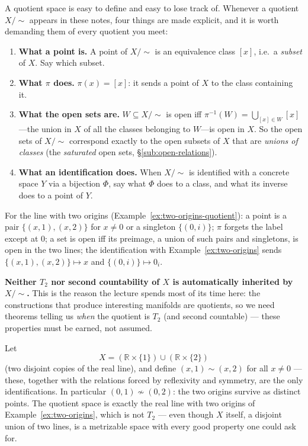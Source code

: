 \documentclass[11pt]{report}
\makeatletter
\newcounter{excounter}[section]
\newcommand{\exlabel}[1]{\edef\@currentlabel{\arabic{section}.\arabic{excounter}}\label{#1}}
\newcommand{\leeref}[1]{\par\smallskip{\raggedleft\footnotesize\textsc{Lee}:\ #1\par}}
\makeatother
\begin{document}
\begin{rembox}\label{rem:how-read-quotient}
A quotient space is easy to define and easy to lose track of. Whenever a quotient $X/{\sim}$ appears in these notes, four things are made explicit, and it is worth demanding them of every quotient you meet:
\begin{enumerate}
    \item \textbf{What a point is.} A point of $X/{\sim}$ is an equivalence class $[x]$, i.e.\ a \emph{subset} of $X$. Say which subset.
    \item \textbf{What $\pi$ does.} $\pi(x) = [x]$: it sends a point of $X$ to the class containing it.
    \item \textbf{What the open sets are.} $W \subseteq X/{\sim}$ is open iff $\pi^{-1}(W) = \bigcup_{[x] \in W} [x]$---the union in $X$ of all the classes belonging to $W$---is open in $X$. So the open sets of $X/{\sim}$ correspond exactly to the open subsets of $X$ that are \emph{unions of classes} (the \emph{saturated} open sets, \S\ref{sub:open-relations}).
    \item \textbf{What an identification does.} When $X/{\sim}$ is identified with a concrete space $Y$ via a bijection $\Phi$, say what $\Phi$ does to a class, and what its inverse does to a point of $Y$.
\end{enumerate}
For the line with two origins (Example~\ref{ex:two-origins-quotient}): a point is a pair $\{(x,1), (x,2)\}$ for $x \neq 0$ or a singleton $\{(0,i)\}$; $\pi$ forgets the label except at $0$; a set is open iff its preimage, a union of such pairs and singletons, is open in the two lines; the identification with Example~\ref{ex:two-origins} sends $\{(x,1),(x,2)\} \mapsto x$ and $\{(0,i)\} \mapsto 0_i$.
\end{rembox}

\begin{rembox}\label{rem:warning-nothing-automatically-inherited}
\textbf{Neither $T_2$ nor second countability of $X$ is automatically inherited by $X/{\sim}$.} This is the reason the lecture spends most of its time here: the constructions that produce interesting manifolds are quotients, so we need theorems telling us \emph{when} the quotient is $T_2$ (and second countable) --- these properties must be earned, not assumed.
\end{rembox}

\begin{exbox}\exlabel{ex:two-origins-quotient}
Let
\[
X = (\mathbb{R} \times \{1\}) \cup (\mathbb{R} \times \{2\})
\]
(two disjoint copies of the real line), and define $(x, 1) \sim (x, 2)$ for all $x \neq 0$ --- these, together with the relations forced by reflexivity and symmetry, are the only identifications. In particular $(0,1) \not\sim (0,2)$: the two origins survive as distinct points. The quotient space is exactly the real line with two origins of Example~\ref{ex:two-origins}, which is not $T_2$ --- even though $X$ itself, a disjoint union of two lines, is a metrizable space with every good property one could ask for.
\leeref{Problem 1-1}
\end{exbox}
\end{document}
